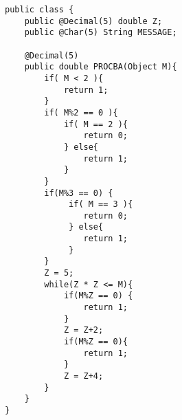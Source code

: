 \begin{lstlisting}[language=PL/I, caption=Probdivision-Algorhitmus Java, label={lst:javaprobedivision}]
public class { 
	public @Decimal(5) double Z;
	public @Char(5) String MESSAGE;
	
	@Decimal(5)
	public double PROCBA(Object M){
		if( M < 2 ){
			return 1;
		}
		if( M%2 == 0 ){
			if( M == 2 ){
				return 0;
			} else{ 
				return 1;
			}
		} 
		if(M%3 == 0) {
			 if( M == 3 ){
			 	return 0;
			 } else{ 
			 	return 1;
			 }
		}
		Z = 5;
		while(Z * Z <= M){ 
			if(M%Z == 0) {
				return 1;
			}
			Z = Z+2;
			if(M%Z == 0){
				return 1;
			}
			Z = Z+4;
		}
	}
}
\end{lstlisting}